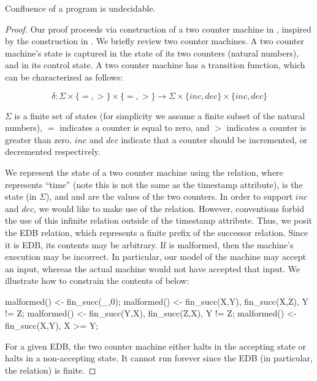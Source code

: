 \begin{lemma}
Confluence of a \lang program is undecidable.
\end{lemma}
\begin{proof}
Our proof proceeds via construction of a two counter machine in \lang, inspired by the construction in .  We briefly review two counter machines.  A two counter machine's state is captured in the state of its two counters (natural numbers), and in its control state.  A two counter machine has a transition function, which can be characterized as follows:

$$\delta: \Sigma \times \{=, >\} \times \{=, >\} \rightarrow \Sigma \times \{inc, dec\} \times \{inc, dec\}$$

$\Sigma$ is a finite set of states (for simplicity we assume a finite subset of the natural numbers), $=$ indicates a counter is equal to zero, and $>$ indicates a counter is greater than zero.  $inc$ and $dec$ indicate that a counter should be incremented, or decremented respectively.

We represent the state of a two counter machine using the  relation, where  represents ``time'' (note this is not the same as the timestamp attribute),  is the state (in $\Sigma$), and  and  are the values of the two counters.  In order to support $inc$ and $dec$, we would like to make use of the  relation.  However, \lang conventions forbid the use of this infinite relation outside of the timestamp attribute.  Thus, we posit the  EDB relation, which represents a finite prefix of the successor relation.  Since it is EDB, its contents may be arbitrary.  If  is malformed, then the machine's execution may be incorrect.  In particular, our model of the machine may accept an input, whereas the actual machine would not have accepted that input.  We illustrate how to constrain the contents of  below:

\begin{Dedalus}
malformed() <- fin_succ(_,0);
malformed() <- fin_succ(X,Y), fin_succ(X,Z), Y != Z;
malformed() <- fin_succ(Y,X), fin_succ(Z,X), Y != Z;
malformed() <- fin_succ(X,Y), X >= Y;
\end{Dedalus}

For a given EDB, the two counter machine either halts in the accepting state or halts in a non-accepting state.  It cannot run forever since the EDB (in particular, the  relation) is finite.


\end{proof}
